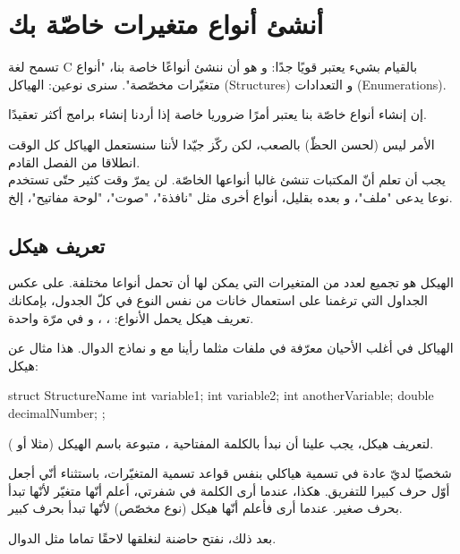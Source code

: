 \chapter{أنشئ أنواع متغيرات خاصّة بك}

تسمح لغة \textenglish{C}
بالقيام بشيء يعتبر قويًا جدًا: و هو أن ننشئ أنواعًا خاصة بنا، "أنواع متغيّرات مخصّصة". سنرى نوعين: الهياكل
(\textenglish{Structures})
و التعدادات
(\textenglish{Enumerations}).

 إن إنشاء أنواع خاصّة بنا يعتبر أمرًا ضروريا خاصة إذا أردنا إنشاء برامج أكثر تعقيدًا.

الأمر ليس  (لحسن الحظّ) بالصعب، لكن ركّز جيّدا لأننا سنستعمل الهياكل كل الوقت انطلاقا من الفصل القادم.\\
يجب أن تعلم أنّ المكتبات تنشئ غالبا أنواعها الخاصّة. لن يمرّ وقت كثير حتّى تستخدم نوعا يدعى "ملف"، و بعده بقليل، أنواع أخرى مثل "نافذة"، "صوت"، "لوحة مفاتيح"، إلخ.

\section{تعريف هيكل}

الهيكل هو تجميع لعدد من المتغيرات التي يمكن لها أن تحمل أنواعا مختلفة. على عكس الجداول التي ترغمنا على استعمال خانات من نفس النوع في كلّ الجدول، بإمكانك تعريف هيكل يحمل الأنواع:
، ، 
و
في مرّة واحدة.

الهياكل في أغلب الأحيان معرّفة في ملفات
مثلما رأينا مع
و نماذج الدوال. هذا مثال عن هيكل:

\begin{Csource}
struct StructureName
{
	int variable1;
	int variable2;
	int anotherVariable;
	double decimalNumber;
};
\end{Csource}

لتعريف هيكل، يجب علينا أن نبدأ بالكلمة المفتاحية
،
متبوعة باسم الهيكل (مثلا
أو
).

\begin{information}
  شخصيّا لديّ عادة في تسمية هياكلي بنفس قواعد تسمية المتغيّرات، باستثناء أنّي أجعل أوّل حرف كبيرا للتفريق. هكذا، عندما أرى الكلمة
في شفرتي، أعلم أنّها متغيّر لأنّها تبدأ بحرف صغير. عندما أرى
فأعلم أنّها هيكل (نوع مخصّص) لأنّها تبدأ بحرف كبير.
\end{information}

بعد ذلك، نفتح حاضنة لنغلقها لاحقًا تماما مثل الدوال.

